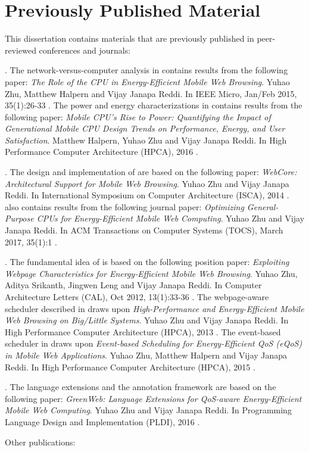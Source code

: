\section{Previously Published Material}
\label{sec:intro:prev}

This dissertation contains materials that are previously published in peer-reviewed conferences and journals:

\textbf{}. The network-versus-computer analysis in  contains results from the following paper: \textit{The Role of the CPU in Energy-Efficient Mobile Web Browsing}. Yuhao Zhu, Matthew Halpern and Vijay Janapa Reddi. In IEEE Micro, Jan/Feb 2015, 35(1):26-33 \cite{zhu2015role}. The power and energy characterizations in  contains results from the following paper: \textit{Mobile CPU's Rise to Power: Quantifying the Impact of Generational Mobile CPU Design Trends on Performance, Energy, and User Satisfaction}. Matthew Halpern, Yuhao Zhu and Vijay Janapa Reddi. In High Performance Computer Architecture (HPCA), 2016 \cite{mobilecpu}.

\textbf{}. The design and implementation of \webcore are based on the following paper: \textit{WebCore: Architectural Support for Mobile Web Browsing}. Yuhao Zhu and Vijay Janapa Reddi. In International Symposium on Computer Architecture (ISCA), 2014 \cite{webcore}.  also contains results from the following journal paper: \textit{Optimizing General-Purpose CPUs for Energy-Efficient Mobile Web Computing}. Yuhao Zhu and Vijay Janapa Reddi. In ACM Transactions on Computer Systems (TOCS), March 2017, 35(1):1 \cite{webcore-tocs}.

\textbf{}. The fundamental idea of \webrt is based on the following position paper:  \textit{Exploiting Webpage Characteristics for Energy-Efficient Mobile Web Browsing}. Yuhao Zhu, Aditya Srikanth, Jingwen Leng and Vijay Janapa Reddi. In Computer Architecture Letters (CAL), Oct 2012, 13(1):33-36 \cite{zhu2014exploiting}. The webpage-aware scheduler described in  draws upon \textit{High-Performance and Energy-Efficient Mobile Web Browsing on Big/Little Systems}. Yuhao Zhu and Vijay Janapa Reddi.  In High Performance Computer Architecture (HPCA), 2013 \cite{big-little}. The event-based scheduler in  draws upon \textit{Event-based Scheduling for Energy-Efficient QoS (eQoS) in Mobile Web Applications}. Yuhao Zhu, Matthew Halpern and Vijay Janapa Reddi. In High Performance Computer Architecture (HPCA), 2015 \cite{ebs}.

\textbf{}. The \greenweb language extensions and the \autogreen annotation framework are based on the following paper: \textit{GreenWeb: Language Extensions for QoS-aware Energy-Efficient Mobile Web Computing}. Yuhao Zhu and Vijay Janapa Reddi. In Programming Language Design and Implementation (PLDI), 2016 \cite{greenweb}.

Other publications: 


